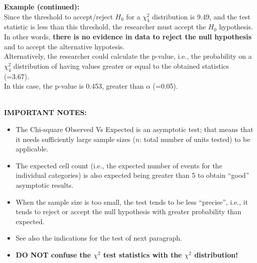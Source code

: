 \begin{frame}
  \textbf{Example (continued):}\\
  \vspace{0.35cm}
  Since the threshold to accept/reject $H_0$ for a $\chi^2_4$ distribution is 9.49, and the test statistic is less than this threshold, the researcher must accept the $H_0$ hypothesis.\\
  \vspace{0.35cm}
  In other words, \textbf{there is no evidence in data to reject the null hypothesis} and to accept the alternative hypotesis.\\
  \vspace{0.35cm}
  Alternatively, the researcher could calculate the p-value, i.e., the probability on a $\chi^2_4$ distribution of having values greater or equal to the obtained statistics (=3.67). \\
  \vspace{0.35cm}
  In this case, the p-value is 0.453, greater than $\alpha$ (=0.05).  \\ \hspace*{11cm} \Square \\
\end{frame}

\begin{frame}
  \textbf{IMPORTANT NOTES:}\\
  \begin{itemize}
  \item The Chi-square Observed Vs Expected is an asymptotic test; that means that it needs sufficiently large sample sizes ($n$: total number of units tested) to be applicable.\\
  \item The expected cell count (i.e., the expected number of events for the individual categories) is also expected being greater than 5 to obtain ``good'' asymptotic results.
  \item When the sample size is too small, the test tends to be less ``precise'', i.e., it tends to reject or accept the null hypothesis with greater probability than expected.\\
  \item See also the indications for the test of next paragraph.
  \item \textbf{DO NOT confuse the $\chi^2$ test statistics with the $\chi^2$ distribution!}
  \end{itemize}
\end{frame}


